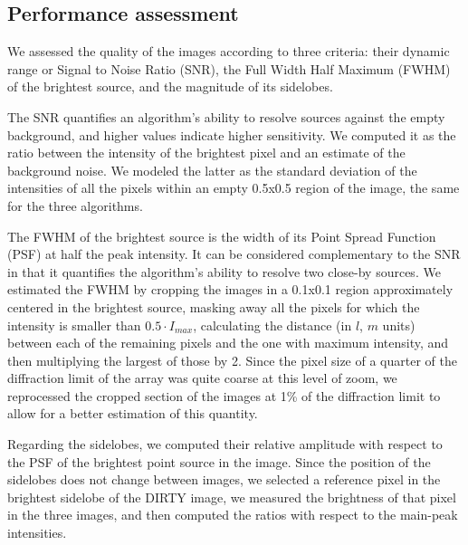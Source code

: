 \documentclass[11pt]{article}
\begin{document}

\subsection{Performance assessment}
\label{ss:methods:performance}

We assessed the quality of the images according to three criteria: their dynamic range or Signal to Noise Ratio (SNR), the Full Width Half Maximum (FWHM) of the brightest source, and the magnitude of its sidelobes.

The SNR quantifies an algorithm's ability to resolve sources against the empty background, and higher values indicate higher sensitivity.
We computed it as the ratio between the intensity of the brightest pixel and an estimate of the background noise.
We modeled the latter as the standard deviation of the intensities of all the pixels within an empty 0.5x0.5 region of the image, the same for the three algorithms.

The FWHM of the brightest source is the width of its Point Spread Function (PSF) at half the peak intensity.
It can be considered complementary to the SNR in that it quantifies the algorithm's ability to resolve two close-by sources.
We estimated the FWHM by cropping the images in a 0.1x0.1 region approximately centered in the brightest source, masking away all the pixels for which the intensity is smaller than $0.5 \cdot I_{max}$, calculating the distance (in $l$, $m$ units) between each of the remaining pixels and the one with maximum intensity, and then multiplying the largest of those by 2.
Since the pixel size of a quarter of the diffraction limit of the array was quite coarse at this level of zoom, we reprocessed the cropped section of the images at 1\% of the diffraction limit to allow for a better estimation of this quantity.

Regarding the sidelobes, we computed their relative amplitude with respect to the PSF of the brightest point source in the image.
Since the position of the sidelobes does not change between images, we selected a reference pixel in the brightest sidelobe of the DIRTY image, we measured the brightness of that pixel in the three images, and then computed the ratios with respect to the main-peak intensities.
\end{document}
